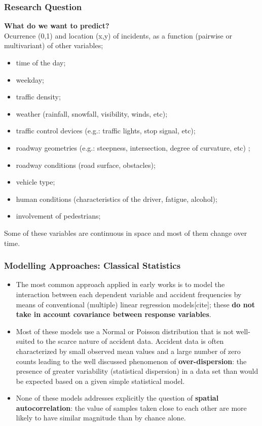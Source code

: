 \documentclass[hyperref={pdfpagelabels=true}]{beamer}
\begin{document}
\begin{frame}
\frametitle{Research Question}
\textbf{ What do we want to predict?}\\
Ocurrence (0,1) and location (x,y) of incidents, as a function (pairwise or multivariant) of other variables;
\small{
\begin{itemize}
\item time of the day;
\item weekday;
\item traffic density;
\item weather (rainfall, snowfall, visibility, winds, etc);
\item traffic control devices (e.g.: traffic lights, stop signal, etc);
\item roadway geometries (e.g.: steepness, intersection, degree of curvature, etc) 
;
\item roadway conditions (road surface, obstacles);
\item vehicle type;
\item human conditions (characteristics of the driver, fatigue, alcohol);
\item involvement of pedestrians;
\end{itemize}
}
Some of these variables are continuous in space and most of them change over time.\\
\end{frame}

\begin{frame}
\frametitle{Modelling Approaches: Classical Statistics}
\begin{itemize}
\item<1-> The most common approach applied in early works is to model the interaction between each dependent variable and accident frequencies by means of conventional (multiple) linear
regression models[cite]; these \textbf{do not take in account covariance between response variables}. 
\item<2-> Most of these models use a Normal or Poisson distribution that is not well-suited to the scarce nature of accident data. Accident data is often characterized by small observed mean values and a large number of zero counts leading to the well discussed phenomenon of \textbf{over-dispersion}: the presence of greater variability (statistical dispersion) in a data set than would be expected based on a given simple statistical model.
\item<3-> None of these models addresses explicitly the question of \textbf{spatial autocorrelation}: the value of samples taken close to each other are more likely to have similar magnitude than by chance alone.
\end{itemize}
\end{frame}
\end{document}
